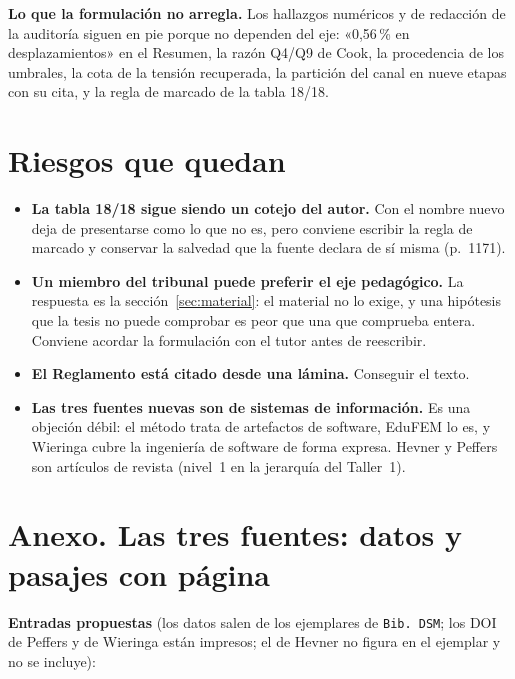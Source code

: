 \documentclass[11pt,a4paper]{article}
\begin{document}
\textbf{Lo que la formulación no arregla.} Los hallazgos numéricos y de redacción de la auditoría siguen en pie porque no dependen del eje: «0,56\,\% en desplazamientos» en el Resumen, la razón Q4/Q9 de Cook, la procedencia de los umbrales, la cota de la tensión recuperada, la partición del canal en nueve etapas con su cita, y la regla de marcado de la tabla 18/18.

\section{Riesgos que quedan}

\begin{itemize}
\item \textbf{La tabla 18/18 sigue siendo un cotejo del autor.} Con el nombre nuevo deja de presentarse como lo que no es, pero conviene escribir la regla de marcado y conservar la salvedad que la fuente declara de sí misma (p.~1171).
\item \textbf{Un miembro del tribunal puede preferir el eje pedagógico.} La respuesta es la sección~\ref{sec:material}: el material no lo exige, y una hipótesis que la tesis no puede comprobar es peor que una que comprueba entera. Conviene acordar la formulación con el tutor antes de reescribir.
\item \textbf{El Reglamento está citado desde una lámina.} Conseguir el texto.
\item \textbf{Las tres fuentes nuevas son de sistemas de información.} Es una objeción débil: el método trata de artefactos de software, EduFEM lo es, y Wieringa cubre la ingeniería de software de forma expresa. Hevner y Peffers son artículos de revista (nivel~1 en la jerarquía del Taller~1).
\end{itemize}

\appendix
\section*{Anexo. Las tres fuentes: datos y pasajes con página}

\textbf{Entradas propuestas} (los datos salen de los ejemplares de \texttt{Bib.~DSM}; los DOI de Peffers y de Wieringa están impresos; el de Hevner no figura en el ejemplar y no se incluye):
\end{document}
